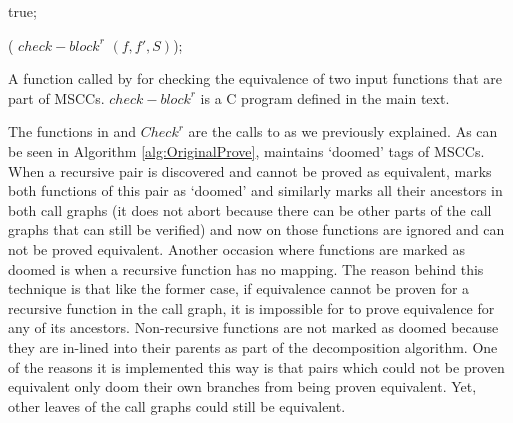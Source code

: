 \begin{algorithm}
\begin{algorithmic}[1]


 true; \EndIf

  ( $check-block^r$  $(f,f',S)$); \EndFunction
\end{algorithmic}
\caption{A function called by  for checking the equivalence of two input functions that are part of MSCCs. $check-block^r$ is a C program defined in the main text.}
\label{alg:Checkr}
\end{algorithm}


The  functions in  and $Check^r$ are the calls to  as we previously explained. As can be seen in Algorithm \ref{alg:OriginalProve},  maintains `doomed' tags of MSCCs. When a recursive pair is discovered and cannot be proved as equivalent,  marks both functions of this pair as `doomed' and similarly marks all their ancestors in both call graphs (it does not abort because there can be other parts of the call graphs that can still be verified) and now on those functions are ignored and can not be proved equivalent. Another occasion where functions are marked as doomed is when a recursive function has no mapping. The reason behind this technique is that like the former case, if equivalence cannot be proven for a recursive function in the call graph, it is impossible for  to prove equivalence for any of its ancestors. Non-recursive functions are not marked as doomed because they are in-lined into their parents as part of the decomposition algorithm. One of the reasons it is implemented this way is that pairs which could not be proven equivalent only doom their own branches from being proven equivalent. Yet, other leaves of the call graphs could still be equivalent. 

